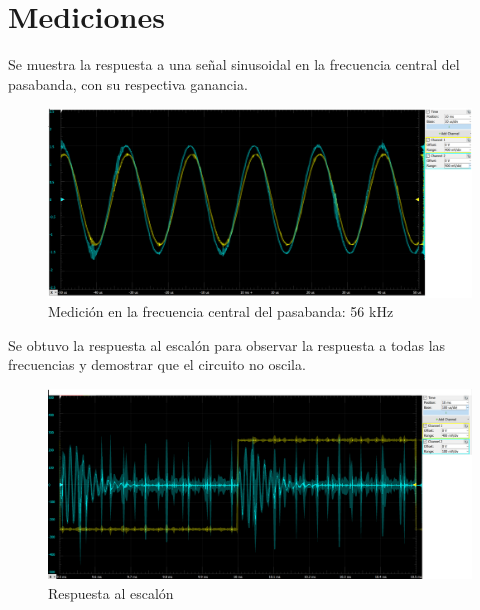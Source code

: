 \documentclass[../../tc_tp5_main.tex]{subfiles}
\begin{document}
 	 \section{Mediciones}
 	 
 	 Se muestra la respuesta a una señal sinusoidal en la frecuencia central del pasabanda, con su respectiva ganancia.
 	\begin{figure}[H]	%
	\centering
	\includegraphics[scale=0.5]{imagenes/frec_corte_posta.png}
	\caption{Medición en la frecuencia central del pasabanda: 56 kHz}
	\label{fig:ej2_frec_corte_posta}
	\end{figure}
	
	Se obtuvo la respuesta al escalón para observar la respuesta a todas las frecuencias y demostrar que el circuito no oscila.
	
 	\begin{figure}[H]	%
	\centering
	\includegraphics[scale=0.5]{imagenes/resp_esc.png}
	\caption{Respuesta al escalón}
	\label{fig:ej2_resp_escalon}
	\end{figure}
	
\end{document}

